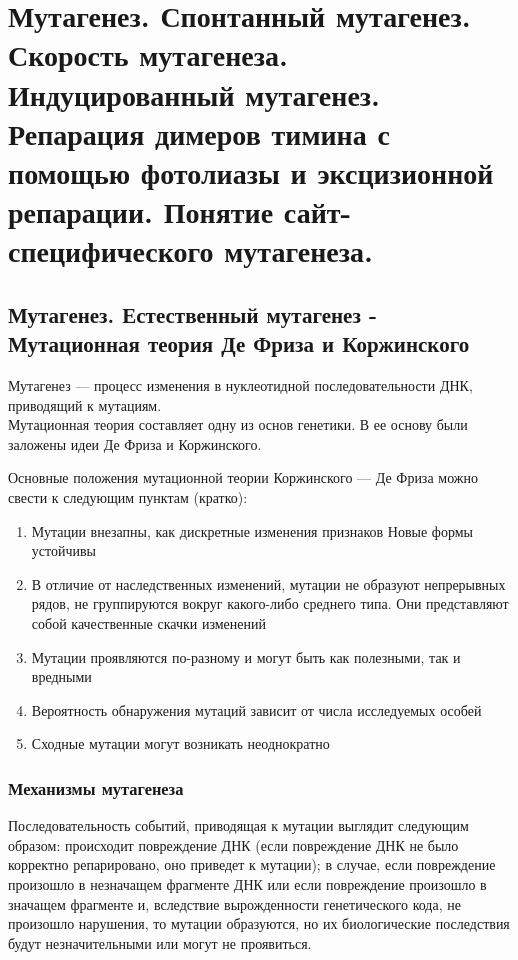 \section{Мутагенез. Спонтанный мутагенез. Скорость мутагенеза.
Индуцированный мутагенез. Репарация димеров тимина с помощью фотолиазы и эксцизионной репарации.
Понятие сайт-специфического мутагенеза.}
	
\subsection{Мутагенез. Естественный мутагенез - Мутационная теория Де Фриза и Коржинского}

Мутагенез — процесс изменения в нуклеотидной последовательности ДНК, приводящий к мутациям. \\

Мутационная теория составляет одну из основ генетики. В ее основу были заложены идеи Де Фриза и Коржинского.

Основные положения мутационной теории Коржинского — Де Фриза можно свести к следующим пунктам (кратко):

\begin{enumerate}
	\item Мутации внезапны, как дискретные изменения признаков
	Новые формы устойчивы
	\item В отличие от наследственных изменений, мутации не образуют непрерывных рядов, не группируются вокруг какого-либо среднего типа. Они представляют собой качественные скачки изменений
	\item Мутации проявляются по-разному и могут быть как полезными, так и вредными
	\item Вероятность обнаружения мутаций зависит от числа исследуемых особей
	\item Сходные мутации могут возникать неоднократно
\end{enumerate}

\subsubsection{Механизмы мутагенеза}

Последовательность событий, приводящая к мутации выглядит следующим образом: происходит повреждение ДНК (если повреждение ДНК не было корректно репарировано, оно приведет к мутации); в случае, если повреждение произошло в незначащем фрагменте ДНК или если повреждение произошло в значащем фрагменте и, вследствие вырожденности генетического кода, не произошло нарушения, то мутации образуются, но их биологические последствия будут незначительными или могут не проявиться.

